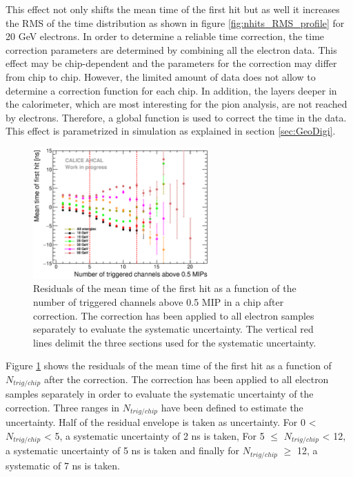 \documentclass{JINST}
\begin{document}
This effect not only shifts the mean time of the first hit but as well it increases the RMS of the time distribution as shown in figure \ref{fig:nhits_RMS_profile} for 20 GeV electrons. In order to determine a reliable time correction, the time correction parameters are determined by combining all the electron data. This effect may be chip-dependent and the parameters for the correction may differ from chip to chip. However, the limited amount of data does not allow to determine a correction function for each chip. In addition, the layers deeper in the calorimeter, which are most interesting for the pion analysis, are not reached by electrons. Therefore, a global function is used to correct the time in the data. This effect is parametrized in simulation as explained in section \ref{sec:GeoDigi}.

\begin{figure}[htbp!]
  \centering
  \includegraphics[width=0.6\textwidth]{fig/CheckCorrection.eps}
  \caption{Residuals of the mean time of the first hit as a function of the number of triggered channels above 0.5 MIP in a chip after correction. The correction has been applied to all electron samples separately to evaluate the systematic uncertainty. The vertical red lines delimit the three sections used for the systematic uncertainty.}
  \label{fig:Nhit_residuals}
\end{figure}

Figure \ref{fig:Nhit_residuals} shows the residuals of the mean time of the first hit as a function of $N_{trig/chip}$ after the correction. The correction has been applied to all electron samples separately in order to evaluate the systematic uncertainty of the correction. Three ranges in $N_{trig/chip}$ have been defined to estimate the uncertainty. Half of the residual envelope is taken as uncertainty. For 0 < $N_{trig/chip}$ < 5, a systematic uncertainty of 2 ns is taken, For 5 $\leq$ $N_{trig/chip}$ < 12, a systematic uncertainty of 5 ns is taken and finally for $N_{trig/chip}$ $\geq$ 12, a systematic of 7 ns is taken.
\end{document}
